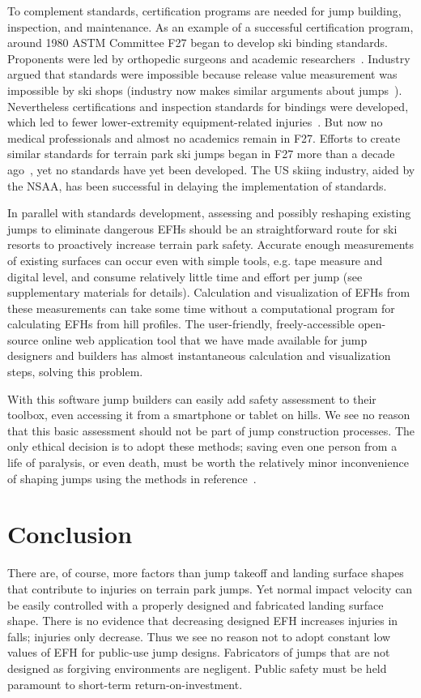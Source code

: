\documentclass{article}
\begin{document}
To complement standards, certification programs are needed for jump building,
inspection, and maintenance. As an example of a successful certification
program, around 1980 ASTM Committee F27 began to develop ski binding standards.
Proponents were led by orthopedic surgeons and academic
researchers~\cite{Bahniuk1996}. Industry argued that standards were impossible
because release value measurement was impossible by ski shops (industry now
makes similar arguments about jumps~\cite{NSAA2015}). Nevertheless
certifications and inspection standards for bindings were developed, which led
to fewer lower-extremity equipment-related injuries~\cite{Bahniuk1996}. But now
no medical professionals and almost no academics remain in F27. Efforts to
create similar standards for terrain park ski jumps began in F27 more than a
decade ago~\cite{SAM2011}, yet no standards have yet been developed. The US
skiing industry, aided by the NSAA, has been successful in delaying the
implementation of standards.

In parallel with standards development, assessing and possibly reshaping
existing jumps to eliminate dangerous EFHs should be an straightforward route
for ski resorts to proactively increase terrain park safety. Accurate enough
measurements of existing surfaces can occur even with simple tools, e.g. tape
measure and digital level, and consume relatively little time and effort per
jump (see supplementary materials for details). Calculation and visualization
of EFHs from these measurements can take some time without a computational
program for calculating EFHs from hill profiles. The user-friendly,
freely-accessible open-source online web application tool that we have made
available for jump designers and builders has almost instantaneous calculation
and visualization steps, solving this problem.

With this software jump builders can easily add safety assessment to their
toolbox, even accessing it from a smartphone or tablet on hills.  We see no
reason that this basic assessment should not be part of jump construction
processes. The only ethical decision is to adopt these methods; saving even one
person from a life of paralysis, or even death, must be worth the relatively
minor inconvenience of shaping jumps using the methods in
reference~\cite{Levy2015}.

\section{Conclusion}
\label{sec:conc}
%
There are, of course, more factors than jump takeoff and landing surface shapes
that contribute to injuries on terrain park jumps. Yet normal impact velocity
can be easily controlled with a properly designed and fabricated landing
surface shape. There is no evidence that decreasing designed EFH increases
injuries in falls; injuries only decrease. Thus we see no reason not to adopt
constant low values of EFH for public-use jump designs. Fabricators of jumps
that are not designed as forgiving environments are negligent. Public safety
must be held paramount to short-term return-on-investment.
\end{document}
